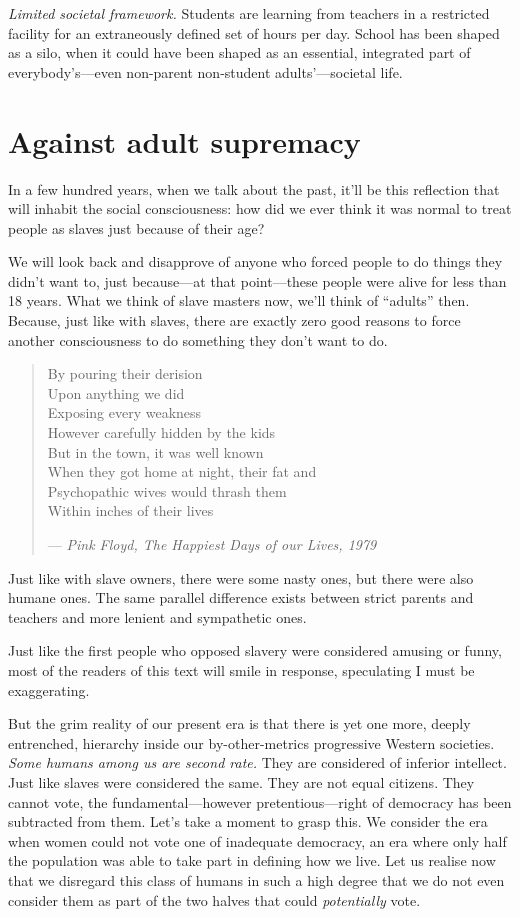 \emph{Limited societal framework.} Students are learning from teachers in a restricted facility for an extraneously defined set of hours per day. School has been shaped as a silo, when it could have been shaped as an essential, integrated part of everybody’s—even non-parent non-student adults’—societal life.

\section{Against adult supremacy}

In a few hundred years, when we talk about the past, it’ll be this reflection that will inhabit the social consciousness: how did we ever think it was normal to treat people as slaves just because of their age?

We will look back and disapprove of anyone who forced people to do things they didn’t want to, just because—at that point—these people were alive for less than 18 years. What we think of slave masters now, we’ll think of “adults” then. Because, just like with slaves, there are exactly zero good reasons to force another consciousness to do something they don’t want to do.

\begin{verse}
    By pouring their derision\\
    Upon anything we did\\
    Exposing every weakness\\
    However carefully hidden by the kids\\
    But in the town, it was well known\\
    When they got home at night, their fat and\\
    Psychopathic wives would thrash them\\
    Within inches of their lives

    — \emph{Pink Floyd, The Happiest Days of our Lives, 1979}
\end{verse}

Just like with slave owners, there were some nasty ones, but there were also humane ones. The same parallel difference exists between strict parents and teachers and more lenient and sympathetic ones.

Just like the first people who opposed slavery were considered amusing or funny, most of the readers of this text will smile in response, speculating I must be exaggerating.

But the grim reality of our present era is that there is yet one more, deeply entrenched, hierarchy inside our by-other-metrics progressive Western societies. \emph{Some humans among us are second rate.} They are considered of inferior intellect. Just like slaves were considered the same. They are not equal citizens. They cannot vote, the fundamental—however pretentious—right of democracy has been subtracted from them. Let’s take a moment to grasp this. We consider the era when women could not vote one of inadequate democracy, an era where only half the population was able to take part in defining how we live. Let us realise now that we disregard this class of humans in such a high degree that we do not even consider them as part of the two halves that could \emph{potentially} vote.

